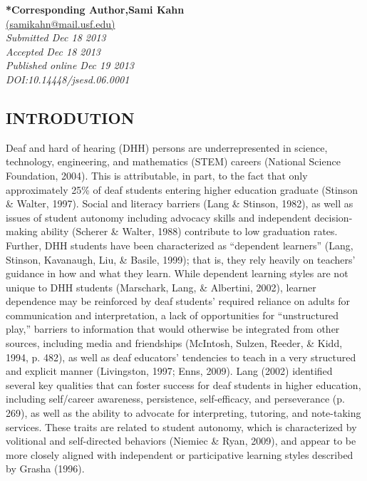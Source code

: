 \documentclass[11.5pt]{sig-alternate} %
\begin{document}

\textbf{*Corresponding Author,Sami Kahn }\\
\href{mailto: msamikahn@mail.usf.edu}{(samikahn@mail.usf.edu)} \\
\textit{Submitted Dec 18 2013 }\\
\textit{Accepted Dec 18 2013} \\
\textit{Published online Dec 19 2013 } \\
\textit{DOI:10.14448/jsesd.06.0001} \\
\pagebreak
\clearpage
\begin{large}
\section*{INTRODUTION}
Deaf and hard of hearing (DHH) persons are underrepresented in science, technology, engineering, and mathematics (STEM) careers (National Science Foundation, 2004).   This is attributable, in part, to the fact that only approximately 25\% of deaf students entering higher education graduate (Stinson \& Walter, 1997).  Social and literacy barriers (Lang \& Stinson, 1982), as well as issues of student autonomy including advocacy skills and independent decision-making ability (Scherer \& Walter, 1988) contribute to low graduation rates. Further, DHH students have been characterized as “dependent learners” (Lang, Stinson, Kavanaugh, Liu, \& Basile, 1999); that is, they rely heavily on teachers’ guidance in how and what they learn. While dependent learning styles are not unique to DHH students (Marschark, Lang, \& Albertini, 2002), learner dependence may be reinforced by deaf students’ required reliance on adults for communication and interpretation, a lack of opportunities for “unstructured play,” barriers to information that would otherwise be integrated from other sources, including media and friendships (McIntosh, Sulzen,  Reeder,  \& Kidd, 1994, p. 482), as well as deaf educators’ tendencies to teach in a very structured and explicit manner (Livingston, 1997; Enns, 2009).  Lang (2002) identified several key qualities that can foster success for deaf students in higher education, including self/career awareness, persistence, self-efficacy, and perseverance (p. 269), as well as the ability to advocate for interpreting, tutoring, and note-taking services. These traits are related to student autonomy, which is characterized by volitional and self-directed behaviors (Niemiec \& Ryan, 2009), and appear to be more closely aligned with independent or participative learning styles described by Grasha (1996). 


\end{large}
\end{document}
